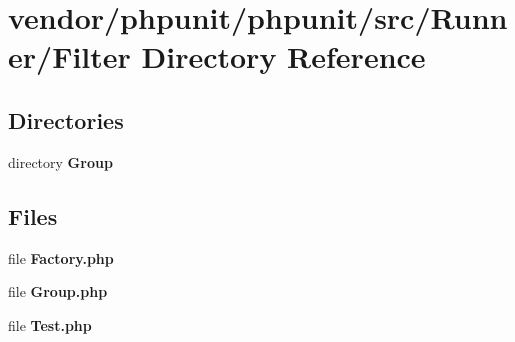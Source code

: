 \section{vendor/phpunit/phpunit/src/\+Runner/\+Filter Directory Reference}
\label{dir_d0273dc0c32dae29f7b8d9d49eece5d7}
\subsection*{Directories}
\begin{DoxyCompactItemize}
\item 
directory {\bf Group}
\end{DoxyCompactItemize}
\subsection*{Files}
\begin{DoxyCompactItemize}
\item 
file {\bf Factory.\+php}
\item 
file {\bf Group.\+php}
\item 
file {\bf Test.\+php}
\end{DoxyCompactItemize}
